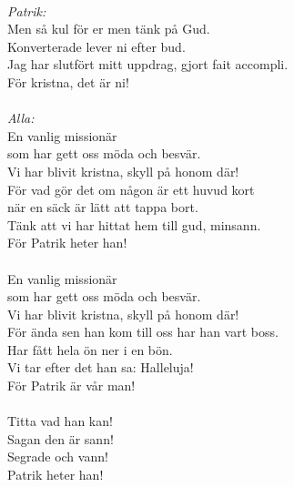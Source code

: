 \documentclass[a6paper, 10pt, twoside]{article}
\begin{document}
\\
\textit{Patrik:} \\
Men så kul för er men tänk på Gud. \\
Konverterade lever ni efter bud. \\
Jag har slutfört mitt uppdrag, gjort fait accompli. \\
För kristna, det är ni! \\
\\
\textit{Alla:}\\
En vanlig missionär \\
som har gett oss möda och besvär. \\
Vi har blivit kristna, skyll på honom där! \\
För vad gör det om någon är ett huvud kort \\
när en säck är lätt att tappa bort. \\
Tänk att vi har hittat hem till gud, minsann. \\
För Patrik heter han! \\
\\
En vanlig missionär\\
som har gett oss möda och besvär.\\
Vi har blivit kristna, skyll på honom där! \\
För ända sen han kom till oss har han vart boss. \\
Har fått hela ön ner i en bön. \\
Vi tar efter det han sa: Halleluja! \\
För Patrik är vår man! \\
\\
Titta vad han kan! \\
Sagan den är sann! \\
Segrade och vann! \\
Patrik heter han! 
\end{document}

